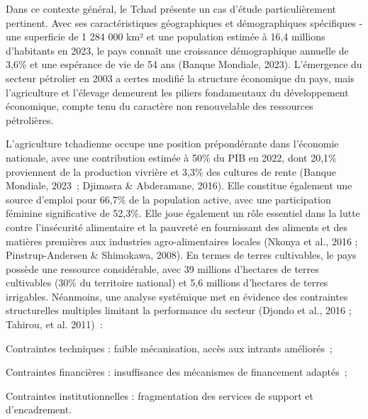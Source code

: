 \documentclass[12pt,oneside]{report}
\begin{document}
Dans ce contexte général, le Tchad présente un cas d'étude particulièrement pertinent. Avec ses caractéristiques géographiques et démographiques spécifiques - une superficie de 1 284 000 km² et une population estimée à 16,4 millions d'habitants en 2023, le pays connaît une croissance démographique annuelle de 3,6\% et une espérance de vie de 54 ans (Banque Mondiale, 2023). L'émergence du secteur pétrolier en 2003 a certes modifié la structure économique du pays, mais l'agriculture et l'élevage demeurent les piliers fondamentaux du développement économique, compte tenu du caractère non renouvelable des ressources pétrolières.

L'agriculture tchadienne occupe une position prépondérante dans l'économie nationale, avec une contribution estimée à 50\% du PIB en 2022, dont 20,1\% proviennent de la production vivrière et 3,3\% des cultures de rente (Banque Mondiale, 2023 ; Djimasra \& Abderamane, 2016). Elle constitue également une source d'emploi pour 66,7\% de la population active, avec une participation féminine significative de 52,3\%. Elle joue également un rôle essentiel dans la lutte contre l'insécurité alimentaire et la pauvreté en fournissant des aliments et des matières premières aux industries agro-alimentaires locales (Nkonya et al., 2016 ; Pinstrup-Andersen \& Shimokawa, 2008). En termes de terres cultivables, le pays possède une ressource considérable, avec 39 millions d'hectares de terres cultivables (30\% du territoire national) et 5,6 millions d'hectares de terres irrigables. Néanmoins, une analyse systémique met en évidence des contraintes structurelles multiples limitant la performance du secteur (Djondo et al., 2016 ; Tahirou, et al. 2011) :

Contraintes techniques : faible mécanisation, accès aux intrants améliorés ;

Contraintes financières : insuffisance des mécanismes de financement adaptés ;

Contraintes institutionnelles : fragmentation des services de support et d'encadrement.
\end{document}
